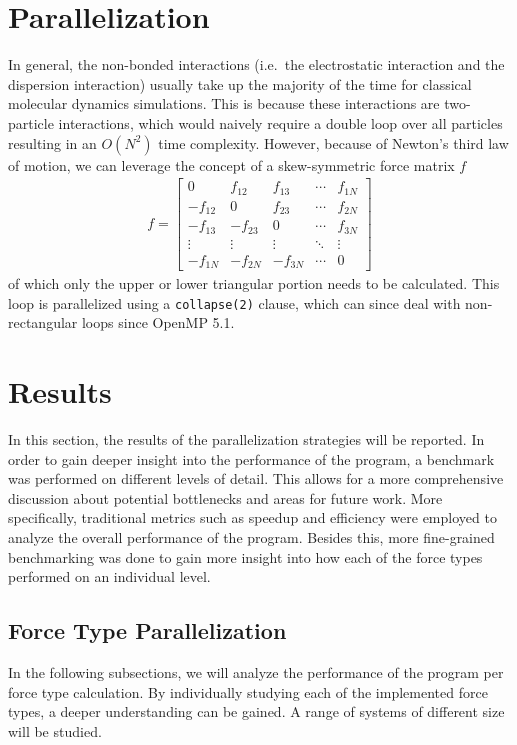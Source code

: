 \documentclass[conference]{IEEEtran}
\begin{document}
\section{Parallelization}
In general, the non-bonded interactions (i.e.\ the electrostatic interaction and the dispersion interaction) usually
take up the majority of the time for classical molecular dynamics simulations. This is because these interactions are
two-particle interactions, which would naively require a double loop over all particles resulting in an $O(N^2)$
time complexity. However, because of Newton's third law of motion, we can leverage the concept of a skew-symmetric 
force matrix $f$
\begin{align*}
        f =
        \begin{bmatrix}
        0 & f_{12} & f_{13} & \cdots & f_{1N} \\
        -f_{12} & 0 & f_{23} & \cdots & f_{2N} \\
        -f_{13} & -f_{23} & 0 & \cdots & f_{3N} \\
        \vdots & \vdots & \vdots & \ddots & \vdots \\
        -f_{1N} & -f_{2N} & -f_{3N} & \cdots & 0
        \end{bmatrix}  
\end{align*}
of which only the upper or lower triangular portion needs to be calculated. This loop is parallelized using a
\verb|collapse(2)| clause, which can since deal with non-rectangular loops since OpenMP 5.1.

\section{Results}
In this section, the results of the parallelization strategies will be reported. In order to gain deeper insight into
the performance of the program, a benchmark was performed on different levels of detail. This allows for a more
comprehensive discussion about potential bottlenecks and areas for future work. More specifically, traditional
metrics such as speedup and efficiency were employed to analyze the overall performance of the program. Besides this,
more fine-grained benchmarking was done to gain more insight into how each of the force types performed on an
individual level.

    \subsection{Force Type Parallelization}
    In the following subsections, we will analyze the performance of the program per force type calculation. By
    individually studying each of the implemented force types, a deeper understanding can be gained. A range of 
    systems of different size will be studied.
\end{document}
